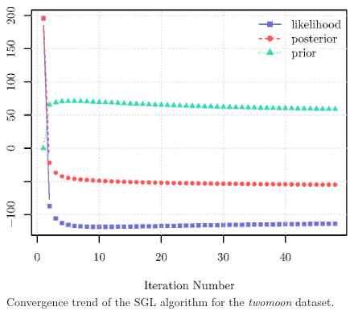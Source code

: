 \begin{figure}[!htb]
  \centering
  \includegraphics[width=.7\textwidth]{clusters/twomoon_trend.eps}
  \caption{Convergence trend of the \textsf{SGL} algorithm for the \textit{twomoon} dataset.}
  \label{fig:twomoon_trend}
\end{figure}
